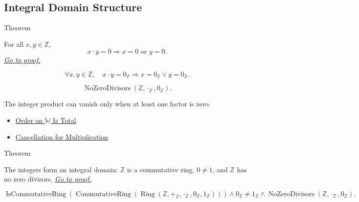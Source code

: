 \subsection*{Integral Domain Structure}

\begin{theorembox}{Theorem}
\begin{theorem}
\label{thm:z-has-no-zero-divisors}
For all $x,y\in\mathbb{Z}$,
\[
x\cdot y=0 \Longrightarrow x=0 \text{ or } y=0.
\]
\hyperref[prf:z-has-no-zero-divisors]{\textit{Go to proof.}}
\end{theorem}
\end{theorembox}

\begin{remark*}
\[
\forall x,y\in\mathbb{Z},\quad
x\cdot y=0_{\mathbb{Z}} \Longrightarrow x=0_{\mathbb{Z}}\lor y=0_{\mathbb{Z}}.
\]
\end{remark*}

\begin{remark*}
\[
\operatorname{NoZeroDivisors}(\mathbb{Z},\cdot_{\mathbb{Z}},0_{\mathbb{Z}}).
\]
\end{remark*}

\begin{remark*}[Interpretation]
The integer product can vanish only when at least one factor is zero.
\end{remark*}

\begin{dependencies}
\begin{itemize}
  \item \hyperref[thm:order-on-w-total]{Order on $
\mathbb{W}$ Is Total}
  \item \hyperref[thm:multiplication-cancellation]{Cancellation for Multiplication}
\end{itemize}
\end{dependencies}

\begin{theorembox}{Theorem}
\begin{theorem}
\label{thm:z-integral-domain}
The integers form an integral domain: $\mathbb{Z}$ is a commutative ring,
$0\ne 1$, and $\mathbb{Z}$ has no zero divisors.
\hyperref[prf:z-integral-domain]{\textit{Go to proof.}}
\end{theorem}
\end{theorembox}

\begin{remark*}
\[
\operatorname{IsCommutativeRing}(
\operatorname{CommutativeRing}(
\operatorname{Ring}(\mathbb{Z},+_{\mathbb{Z}},\cdot_{\mathbb{Z}},
0_{\mathbb{Z}},1_{\mathbb{Z}})))
\land
0_{\mathbb{Z}}\ne1_{\mathbb{Z}}
\land
\operatorname{NoZeroDivisors}(\mathbb{Z},\cdot_{\mathbb{Z}},0_{\mathbb{Z}}).
\]
\end{remark*}

